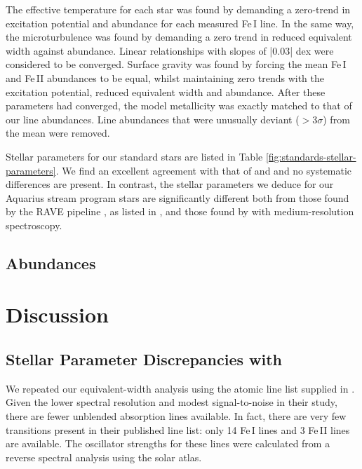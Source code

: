 \documentclass{emulateapj}
\begin{document}
The effective temperature for each star was found by demanding a zero-trend in excitation potential and abundance for each measured Fe\,I line. In the same way, the microturbulence was found by demanding a zero trend in reduced equivalent width against abundance. Linear relationships with slopes of |0.03| dex were considered to be converged. Surface gravity was found by forcing the mean Fe\,I and Fe\,II abundances to be equal, whilst maintaining zero trends with the excitation potential, reduced equivalent width and abundance. After these parameters had converged, the model metallicity was exactly matched to that of our line abundances. Line abundances that were unusually deviant ($>3\sigma$) from the mean were removed.

Stellar parameters for our standard stars are listed in Table \ref{fig:standards-stellar-parameters}. We find an excellent agreement with that of \citet{Gratton;et-al} and \citet{Fulbright;et-al_1997} and no systematic differences are present. In contrast, the stellar parameters we deduce for our Aquarius stream program stars are significantly different both from those found by the RAVE pipeline \citep{}, as listed in \citet{Williams;et-al_2011}, and those found by \citet{Wylie-de-boer;et-al_2012} with medium-resolution spectroscopy. 


\subsection{Abundances}




\section{Discussion}


\subsection{Stellar Parameter Discrepancies with \citet{wylie-de-boer;et-al_2012}}


We repeated our equivalent-width analysis using the atomic line list supplied in \citet{wylie-de-boer;et-al_2012}. Given the lower spectral resolution and modest signal-to-noise in their study, there are fewer unblended absorption lines available. In fact, there are very few transitions present in their published line list: only 14 Fe\,I lines and 3 Fe\,II lines are available.  The oscillator strengths for these lines were calculated from a reverse spectral analysis using the \citet{Hinkle;et-al_2003} solar atlas. 
\end{document}
